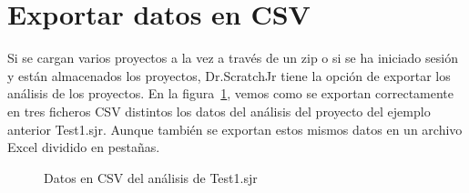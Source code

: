 \documentclass[a4paper, 12pt]{book}
\begin{document}
\newpage
\section{Exportar datos en CSV}
\label{sec:exportarCSV}

Si se cargan varios proyectos a la vez a través de un zip o si se ha iniciado sesión y están almacenados los proyectos, Dr.ScratchJr tiene la opción de exportar los análisis de los proyectos.
En la figura~\ref{fig:Test1_csv}, vemos como se exportan correctamente en tres ficheros CSV distintos los datos del análisis del proyecto del ejemplo anterior Test1.sjr. 
Aunque también se exportan estos mismos datos en un archivo Excel dividido en pestañas.


\begin{figure}[H]
 \centering
    \vspace{7mm}
    \vspace{7mm}
 \caption{Datos en CSV del análisis de Test1.sjr} \label{fig:Test1_csv}
\end{figure}

\end{document}
